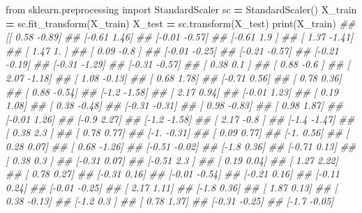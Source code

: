 \documentclass[
]{book}
\newenvironment{Shaded}{\begin{snugshade}}{\end{snugshade}}
\newcommand{\BuiltInTok}[1]{#1}
\newcommand{\CommentTok}[1]{\textcolor[rgb]{0.56,0.35,0.01}{\textit{#1}}}
\newcommand{\ImportTok}[1]{#1}
\newcommand{\NormalTok}[1]{#1}
\newcommand{\OperatorTok}[1]{\textcolor[rgb]{0.81,0.36,0.00}{\textbf{#1}}}
\theoremstyle{definition}
\theoremstyle{definition}
\theoremstyle{definition}
\theoremstyle{definition}
\theoremstyle{remark}
\begin{document}
\begin{Shaded}
\begin{Highlighting}[]
\ImportTok{from}\NormalTok{ sklearn.preprocessing }\ImportTok{import}\NormalTok{ StandardScaler}
\NormalTok{sc }\OperatorTok{=}\NormalTok{ StandardScaler()}
\NormalTok{X\_train }\OperatorTok{=}\NormalTok{ sc.fit\_transform(X\_train)}
\NormalTok{X\_test }\OperatorTok{=}\NormalTok{ sc.transform(X\_test)}
\BuiltInTok{print}\NormalTok{(X\_train)}
\CommentTok{\#\# [[ 0.58 {-}0.89]}
\CommentTok{\#\#  [{-}0.61  1.46]}
\CommentTok{\#\#  [{-}0.01 {-}0.57]}
\CommentTok{\#\#  [{-}0.61  1.9 ]}
\CommentTok{\#\#  [ 1.37 {-}1.41]}
\CommentTok{\#\#  [ 1.47  1.  ]}
\CommentTok{\#\#  [ 0.09 {-}0.8 ]}
\CommentTok{\#\#  [{-}0.01 {-}0.25]}
\CommentTok{\#\#  [{-}0.21 {-}0.57]}
\CommentTok{\#\#  [{-}0.21 {-}0.19]}
\CommentTok{\#\#  [{-}0.31 {-}1.29]}
\CommentTok{\#\#  [{-}0.31 {-}0.57]}
\CommentTok{\#\#  [ 0.38  0.1 ]}
\CommentTok{\#\#  [ 0.88 {-}0.6 ]}
\CommentTok{\#\#  [ 2.07 {-}1.18]}
\CommentTok{\#\#  [ 1.08 {-}0.13]}
\CommentTok{\#\#  [ 0.68  1.78]}
\CommentTok{\#\#  [{-}0.71  0.56]}
\CommentTok{\#\#  [ 0.78  0.36]}
\CommentTok{\#\#  [ 0.88 {-}0.54]}
\CommentTok{\#\#  [{-}1.2  {-}1.58]}
\CommentTok{\#\#  [ 2.17  0.94]}
\CommentTok{\#\#  [{-}0.01  1.23]}
\CommentTok{\#\#  [ 0.19  1.08]}
\CommentTok{\#\#  [ 0.38 {-}0.48]}
\CommentTok{\#\#  [{-}0.31 {-}0.31]}
\CommentTok{\#\#  [ 0.98 {-}0.83]}
\CommentTok{\#\#  [ 0.98  1.87]}
\CommentTok{\#\#  [{-}0.01  1.26]}
\CommentTok{\#\#  [{-}0.9   2.27]}
\CommentTok{\#\#  [{-}1.2  {-}1.58]}
\CommentTok{\#\#  [ 2.17 {-}0.8 ]}
\CommentTok{\#\#  [{-}1.4  {-}1.47]}
\CommentTok{\#\#  [ 0.38  2.3 ]}
\CommentTok{\#\#  [ 0.78  0.77]}
\CommentTok{\#\#  [{-}1.   {-}0.31]}
\CommentTok{\#\#  [ 0.09  0.77]}
\CommentTok{\#\#  [{-}1.    0.56]}
\CommentTok{\#\#  [ 0.28  0.07]}
\CommentTok{\#\#  [ 0.68 {-}1.26]}
\CommentTok{\#\#  [{-}0.51 {-}0.02]}
\CommentTok{\#\#  [{-}1.8   0.36]}
\CommentTok{\#\#  [{-}0.71  0.13]}
\CommentTok{\#\#  [ 0.38  0.3 ]}
\CommentTok{\#\#  [{-}0.31  0.07]}
\CommentTok{\#\#  [{-}0.51  2.3 ]}
\CommentTok{\#\#  [ 0.19  0.04]}
\CommentTok{\#\#  [ 1.27  2.22]}
\CommentTok{\#\#  [ 0.78  0.27]}
\CommentTok{\#\#  [{-}0.31  0.16]}
\CommentTok{\#\#  [{-}0.01 {-}0.54]}
\CommentTok{\#\#  [{-}0.21  0.16]}
\CommentTok{\#\#  [{-}0.11  0.24]}
\CommentTok{\#\#  [{-}0.01 {-}0.25]}
\CommentTok{\#\#  [ 2.17  1.11]}
\CommentTok{\#\#  [{-}1.8   0.36]}
\CommentTok{\#\#  [ 1.87  0.13]}
\CommentTok{\#\#  [ 0.38 {-}0.13]}
\CommentTok{\#\#  [{-}1.2   0.3 ]}
\CommentTok{\#\#  [ 0.78  1.37]}
\CommentTok{\#\#  [{-}0.31 {-}0.25]}
\CommentTok{\#\#  [{-}1.7  {-}0.05]}

\end{Highlighting}
\end{Shaded}
\end{document}
